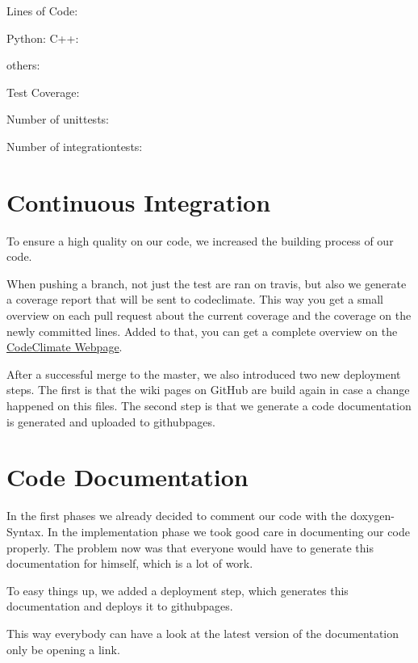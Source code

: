 \documentclass[parskip=full]{scrartcl}
\begin{document}
Lines of Code:

Python:
C++:

others:

Test Coverage:	

Number of \glspl{unittest}:

Number of \glspl{integrationtest}:

\newpage

\section{Continuous Integration}

To ensure a high quality on our code, we increased the building process of our code.

When pushing a branch, not just the test are ran on \gls{travis}, but also we generate a coverage report that will be sent to \gls{codeclimate}.
This way you get a small overview on each pull request about the current coverage and the coverage on the newly committed lines.
Added to that, you can get a complete overview on the
\href{https://codeclimate.com/github/TheSlimvReal/PSE---LA-meets-ML}{CodeClimate Webpage}.

After a successful merge to the master, we also introduced two new deployment steps.
The first is that the wiki pages on GitHub are build again in case a change happened on this files.
The second step is that we generate a code documentation is generated and uploaded to \gls{githubpages}.

\newpage



\section{Code Documentation}

In the first phases we already decided to comment our code with the \gls{doxygen}-Syntax.
In the implementation phase we took good care in documenting our code properly.
The problem now was that everyone would have to generate this documentation for himself, which is a lot of work.

To easy things up, we added a deployment step, which generates this documentation and deploys it to \gls{githubpages}.

This way everybody can have a look at the latest version of the documentation only be opening a link.

\newpage
\end{document}
